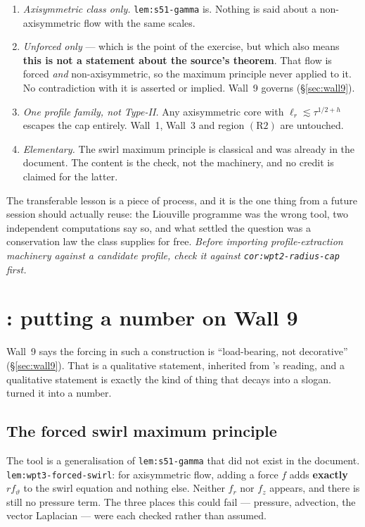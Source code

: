\begin{enumerate}[label=\textup{(\alph*)},leftmargin=2.4em]
\item \emph{Axisymmetric class only.} \texttt{lem:s51-gamma} is. Nothing is said
  about a non-axisymmetric flow with the same scales.
\item \emph{Unforced only} --- which is the point of the exercise, but which
  also means \textbf{this is not a statement about the source's theorem}. That
  flow is forced \emph{and} non-axisymmetric, so the maximum principle never
  applied to it. No contradiction with it is asserted or implied. Wall~9 governs
  (\S\ref{sec:wall9}).
\item \emph{One profile family, not Type-II.} Any axisymmetric core with
  \(\ell_r\lesssim\tau^{1/2+h}\) escapes the cap entirely. Wall~1, Wall~3 and
  region \(\mathrm{(R2)}\) are untouched.
\item \emph{Elementary.} The swirl maximum principle is classical and was
  already in the document. The content is the check, not the machinery, and no
  credit is claimed for the latter.
\end{enumerate}

The transferable lesson is a piece of process, and it is the one thing from
 a future session should actually reuse: the Liouville programme was the
wrong tool, two independent computations say so, and what settled the question
was a conservation law the class supplies for free. \emph{Before importing
profile-extraction machinery against a candidate profile, check it against
\texttt{cor:wpt2-radius-cap} first.}

\section{\texorpdfstring{: putting a number on Wall 9}{S55: putting a number on Wall 9}}
\label{sec:pt-s55}

Wall~9 says the forcing in such a construction is ``load-bearing, not
decorative'' (\S\ref{sec:wall9}). That is a qualitative statement, inherited
from 's reading, and a qualitative statement is exactly the kind of thing
that decays into a slogan.  turned it into a number.

\subsection{The forced swirl maximum principle}

The tool is a generalisation of \texttt{lem:s51-gamma} that did not exist in the
document. \texttt{lem:wpt3-forced-swirl}: for axisymmetric flow, adding a force
\(f\) adds \textbf{exactly} \(r f_\vartheta\) to the swirl equation and nothing
else. Neither \(f_r\) nor \(f_z\) appears, and there is still no pressure term.
The three places this could fail --- pressure, advection, the vector Laplacian
--- were each checked rather than assumed.

